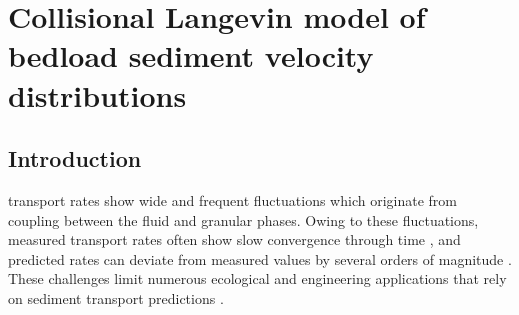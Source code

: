
\chapter{Collisional Langevin model of bedload sediment velocity distributions}
\label{ch:langevin}
\section{Introduction}

\DIFdelbegin {}\DIFdelend \DIFaddbegin {}\DIFaddend transport rates show wide and frequent fluctuations which originate from coupling between the fluid and granular phases.
Owing to these fluctuations, measured transport rates often show slow convergence through time \citep{Dhont2018,Turowski2010}, and predicted rates can deviate from measured values by several orders of magnitude \citep{Recking2012,Martin2003}.
These challenges limit numerous ecological and engineering applications that rely on sediment transport predictions \citep{Gaeuman2017,Malmon2005}.
\DIFaddbegin 

